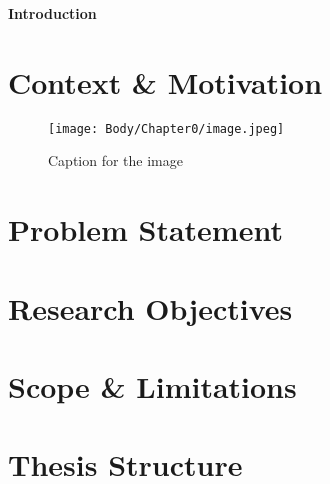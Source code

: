 \begin{center}
    {\Large \textbf{Introduction}}
\end{center}
\vspace{2cm}

\section{Context \& Motivation}
\begin{figure}[h]
    \centering
    \texttt{[image: Body/Chapter0/image.jpeg]}
    \caption{Caption for the image}
    \label{fig:image}
\end{figure}
\section{Problem Statement}

\section{Research Objectives}

\section{Scope \& Limitations}

\section{Thesis Structure}